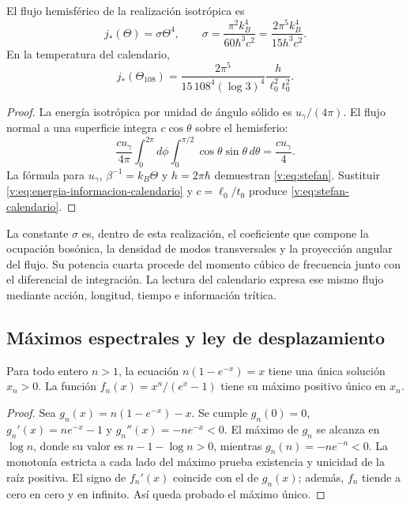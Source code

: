\begin{proposition}
\label{v:prop:stefan}
El flujo hemisférico de la realización isotrópica es
\begin{equation}
 j_*(\Theta)=\sigma\Theta^4,\qquad
 \sigma=\frac{\pi^2 k_B^4}{60\hbar^3c^2}
 =\frac{2\pi^5k_B^4}{15h^3c^2}.
 \label{v:eq:stefan}
\end{equation}
En la temperatura del calendario,
\begin{equation}
 j_*(\Theta_{108})
 =\frac{2\pi^5}{15\,108^4(\log3)^4}
 \frac{h}{\ell_0^2t_0^2}.
 \label{v:eq:stefan-calendario}
\end{equation}
\end{proposition}
\begin{proof}
La energía isotrópica por unidad de ángulo sólido es
\(u_\gamma/(4\pi)\). El flujo normal a una superficie integra
\(c\cos\theta\) sobre el hemisferio:
\[
 \frac{cu_\gamma}{4\pi}
 \int_0^{2\pi}\!d\phi\int_0^{\pi/2}\cos\theta\sin\theta\,d\theta
 =\frac{cu_\gamma}{4}.
\]
La fórmula para \(u_\gamma\), \(\beta^{-1}=k_B\Theta\) y
\(h=2\pi\hbar\) demuestran \eqref{v:eq:stefan}.
Sustituir \eqref{v:eq:energia-informacion-calendario} y
\(c=\ell_0/t_0\) produce \eqref{v:eq:stefan-calendario}.
\end{proof}

La constante \(\sigma\) es, dentro de esta realización, el coeficiente
que compone la ocupación bosónica, la densidad de modos transversales y
la proyección angular del flujo. Su potencia cuarta procede del momento
cúbico de frecuencia junto con el diferencial de integración. La lectura
del calendario expresa ese mismo flujo mediante acción, longitud,
tiempo e información trítica.

\newpage
\subsection{Máximos espectrales y ley de desplazamiento}

\begin{lemma}
\label{v:lem:raiz-wien}
Para todo entero \(n>1\), la ecuación
\(n(1-e^{-x})=x\) tiene una única solución \(x_n>0\).
La función \(f_n(x)=x^n/(e^x-1)\) tiene su máximo positivo único en
\(x_n\).
\end{lemma}
\begin{proof}
Sea \(g_n(x)=n(1-e^{-x})-x\). Se cumple
\(g_n(0)=0\), \(g_n'(x)=ne^{-x}-1\) y
\(g_n''(x)=-ne^{-x}<0\). El máximo de \(g_n\) se alcanza en
\(\log n\), donde su valor es \(n-1-\log n>0\), mientras
\(g_n(n)=-ne^{-n}<0\). La monotonía estricta a cada lado del máximo
prueba existencia y unicidad de la raíz positiva. El signo de
\(f_n'(x)\) coincide con el de \(g_n(x)\); además, \(f_n\) tiende
a cero en cero y en infinito. Así queda probado el máximo único.
\end{proof}

